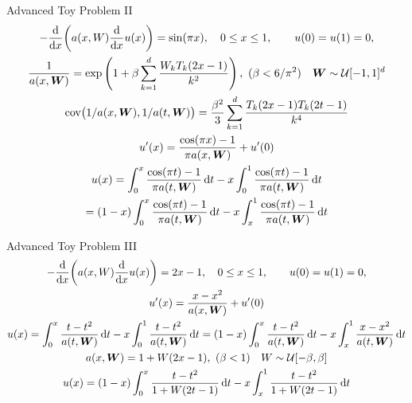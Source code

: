 \documentclass[11pt,compress,xcolor={usenames,dvipsnames},aspectratio=169]{beamer}
\begin{document}
\begin{frame}{Advanced Toy Problem II}
\vspace{-4ex}
\begin{gather*}
-\frac{{\rm d} }{{\rm d} x}\biggl(a(x,W) \frac{{\rm d}}{{\rm d} x} u(x) \biggr) = \sin(\pi x), \quad 0 \leq x \leq 1, \qquad
u(0) = u(1) = 0, \\
\frac{1}{a(x,\boldsymbol{W})} = \exp\left(1 + \beta \sum_{k=1}^d \frac{W_k T_{k}(2x-1)}{k^2} \right) , \ (\beta < 6/\pi^2) \quad \boldsymbol{W} \sim \mathcal{U}[-1,1]^d \\
\operatorname{cov}\bigl(1/a(x,\boldsymbol{W}),1/a(t,\boldsymbol{W})\bigr) = \frac{\beta^2}{3} \sum_{k=1}^d \frac{ T_{k}(2x-1)T_{k}(2t-1)}{k^4}\\
u'(x) = \frac{\cos(\pi x)-1}{\pi a(x,\boldsymbol{W})} + u'(0)\\
u(x) = \int_0^x \frac{\cos(\pi t)-1}{\pi a(t,\boldsymbol{W})} \, {\rm d} t - x \int_0^1 \frac{\cos(\pi t)-1}{\pi a(t,\boldsymbol{W})} \, {\rm d} t \\
= (1-x) \int_0^x \frac{\cos(\pi t)-1}{\pi a(t,\boldsymbol{W})} \, {\rm d} t - x \int_x^1 \frac{\cos(\pi t)-1}{\pi a(t,\boldsymbol{W})} \, {\rm d} t
\end{gather*}

\end{frame}


\begin{frame}{Advanced Toy Problem III}
\vspace{-4ex}
\begin{gather*}
-\frac{{\rm d} }{{\rm d} x}\biggl(a(x,W) \frac{{\rm d}}{{\rm d} x} u(x) \biggr) = 2x - 1, \quad 0 \leq x \leq 1, \qquad
u(0) = u(1) = 0, \\
u'(x) = \frac{x - x^2}{a(x,\boldsymbol{W})} + u'(0)\\
u(x) = \int_0^x \frac{t - t^2}{a(t,\boldsymbol{W})} \, {\rm d} t - x \int_0^1 \frac{t - t^2}{a(t,\boldsymbol{W})} \, {\rm d} t = (1-x) \int_0^x \frac{t - t^2}{a(t,\boldsymbol{W})} \, {\rm d} t - x \int_x^1 \frac{x - x^2}{a(t,\boldsymbol{W})} \, {\rm d} t \\
a(x,\boldsymbol{W}) = 1 +  W (2x-1) , \ (\beta < 1) \quad W \sim \mathcal{U}[-\beta,\beta] \\
u(x) = (1-x) \int_0^x \frac{t - t^2}{1 +  W (2t-1)} \, {\rm d} t - x \int_x^1 \frac{t - t^2}{1 +  W (2t-1)} \, {\rm d} t 
\end{gather*}

\end{frame}
\end{document}
